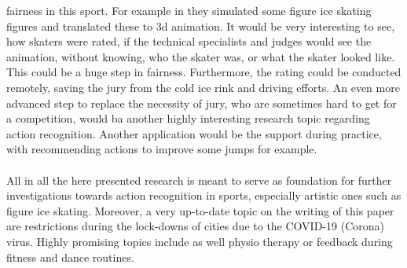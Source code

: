 fairness in this sport.
For example in\cite{figureskatingsimulation} they simulated some figure ice skating figures and translated these to 3d
animation. It would be very interesting to see, how skaters were rated, if the technical specialists and judges would see
the animation, without knowing, who the skater was, or what the skater looked like.
This could be a huge step in fairness.
Furthermore, the rating could be conducted remotely, saving the jury from the cold
ice rink and driving efforts.
An even more advanced step to replace the necessity of jury, who are sometimes hard to get for a competition, would ba another
highly interesting research topic regarding action recognition.
Another application would be the support during practice, with recommending actions to improve some jumps for example.
\\\mbox{}\\
All in all the here presented research is meant to serve as foundation for further investigations towards action recognition
in sports, especially artistic ones such as figure ice skating.
Moreover, a very up-to-date topic on the writing of this paper are restrictions during the lock-downs of cities due to the
COVID-19 (Corona) virus.
Highly promising topics include as well physio therapy or feedback during fitness and dance routines.
